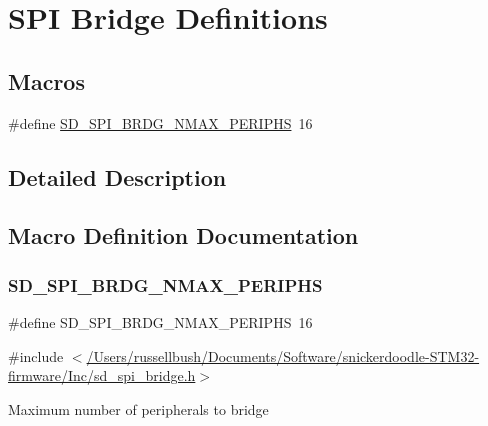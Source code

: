 \hypertarget{group___s_d___b_r_d_g___definitions}{}\section{S\+PI Bridge Definitions}
\label{group___s_d___b_r_d_g___definitions}
\subsection*{Macros}
\begin{DoxyCompactItemize}
\item 
\#define \mbox{\hyperlink{group___s_d___b_r_d_g___definitions_ga63b81f77e00ea208cc7b1a158c73c9aa}{S\+D\+\_\+\+S\+P\+I\+\_\+\+B\+R\+D\+G\+\_\+\+N\+M\+A\+X\+\_\+\+P\+E\+R\+I\+P\+HS}}~16
\end{DoxyCompactItemize}


\subsection{Detailed Description}


\subsection{Macro Definition Documentation}
\mbox{\label{group___s_d___b_r_d_g___definitions_ga63b81f77e00ea208cc7b1a158c73c9aa}} 
\subsubsection{\texorpdfstring{S\+D\+\_\+\+S\+P\+I\+\_\+\+B\+R\+D\+G\+\_\+\+N\+M\+A\+X\+\_\+\+P\+E\+R\+I\+P\+HS}{SD\_SPI\_BRDG\_NMAX\_PERIPHS}}
{\footnotesize\ttfamily \#define S\+D\+\_\+\+S\+P\+I\+\_\+\+B\+R\+D\+G\+\_\+\+N\+M\+A\+X\+\_\+\+P\+E\+R\+I\+P\+HS~16}



{\ttfamily \#include $<$\mbox{\hyperlink{sd__spi__bridge_8h}{/\+Users/russellbush/\+Documents/\+Software/snickerdoodle-\/\+S\+T\+M32-\/firmware/\+Inc/sd\+\_\+spi\+\_\+bridge.\+h}}$>$}

Maximum number of peripherals to bridge 